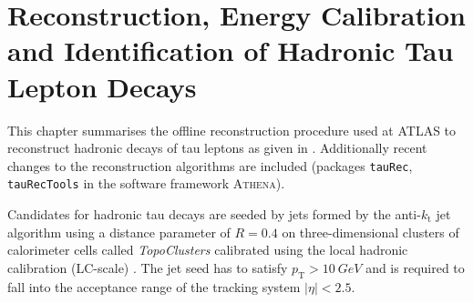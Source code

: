 \chapter{Reconstruction, Energy Calibration and
  Identification of Hadronic Tau Lepton Decays}
\label{sec:reconstruction}

%
%
This chapter summarises the offline reconstruction procedure used at ATLAS to
reconstruct hadronic decays of tau leptons as given in \cite{atlas:taurec:run1,
  atlas:taurec:run2}. Additionally recent changes to the reconstruction
algorithms are included (packages \texttt{tauRec}, \texttt{tauRecTools} in the
software framework \textsc{Athena}).

Candidates for hadronic tau decays are seeded by jets formed by the
anti-$k_\mathrm{t}$ jet algorithm using a distance parameter of $R = 0.4$ on
three-dimensional clusters of calorimeter cells called \emph{TopoClusters}
calibrated using the local hadronic calibration (LC-scale)
\cite{local_hadronic_calib}. The jet seed has to
satisfy $p_\mathrm{T} > \SI{10}{GeV}$ and is required to fall into the
acceptance range of the tracking system $|\eta| < \num{2.5}$. 

